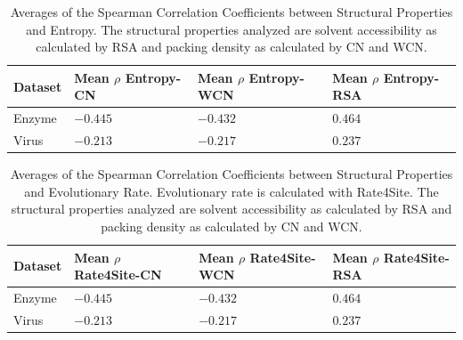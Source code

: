\documentclass[12pt]{article}
\begin{document}
\begin{center}
	\begin{table}[H]
	\begin{tabular}{| p{1.5cm} | p{2.5cm} | p{2cm} | p{2cm} | }
		\hline
		Dataset & Mean $\rho$ Entropy-CN  & Mean $\rho$ Entropy-WCN & Mean $\rho$ Entropy-RSA \\
		\hline	
		Enzyme &  $-0.445$  & $-0.432$ & $0.464$ \\
		\hline
		Virus & $-0.213$ & $-0.217$ & $0.237$ \\
		\hline	
	\end{tabular}
	\caption{Averages of the Spearman Correlation Coefficients between Structural Properties and Entropy. The structural properties analyzed are solvent accessibility as calculated by RSA and packing density as calculated by CN and WCN.}
	\label{table:entropy_stats}
	\end{table}
\end{center}

\begin{center}
	\begin{table}[H]
	\begin{tabular}{| p{1.5cm} | p{2.5cm} | p{2cm} | p{2cm} |  }
		\hline
		Dataset & Mean $\rho$ Rate4Site-CN  & Mean $\rho$ Rate4Site-WCN & Mean $\rho$ Rate4Site-RSA \\
		\hline	
		Enzyme &  $-0.445$  & $-0.432$ & $0.464$ \\
		\hline
		Virus & $-0.213$ & $-0.217$ & $0.237$ \\
		\hline	
	\end{tabular}
	\caption{Averages of the Spearman Correlation Coefficients between Structural Properties and Evolutionary Rate. Evolutionary rate is calculated with Rate4Site. The structural properties analyzed are solvent accessibility as calculated by RSA and packing density as calculated by CN and WCN.}
	\label{table:rate_stats}
	\end{table}
\end{center}
\end{document}
